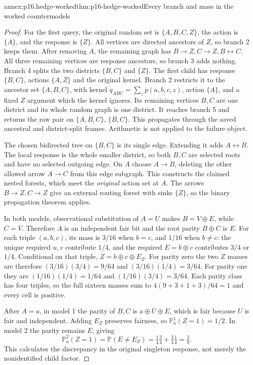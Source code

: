\begin{annexitem}{annex:p16.hedge-worked}{thm:p16-hedge-worked}{Every branch and mass in the worked countermodels}
\begin{proof}
For the first query, the original random set is \(\{A,B,C,Z\}\),
the action is \(\{A\}\), and the response is \(\{Z\}\).
All vertices are directed ancestors of \(Z\), so branch 2
keeps them. After removing \(A\), the remaining graph has
\(B\to Z,C\to Z,B\leftrightarrow C\). All three remaining
vertices are response ancestors, so branch 3 adds nothing.
Branch 4 splits the two districts \(\{B,C\}\) and \(\{Z\}\).
The first child has response \(\{B,C\}\), actions \(\{A,Z\}\)
and the original kernel. Branch 2 restricts it to the ancestor set
\(\{A,B,C\}\), with kernel \(q_{ABC}=\sum_z p(a,b,c,z)\),
action \(\{A\}\), and a fixed \(Z\) argument which the kernel
ignores. Its remaining vertices \(B,C\) are one district and
its whole random graph is one district. It reaches branch 5 and
returns the raw pair on \(\{A,B,C\}\), \(\{B,C\}\).
This propagates through the saved ancestral and district-split
frames. Arithmetic is not applied to the failure object.

The chosen bidirected tree on \(\{B,C\}\) is its single edge.
Extending it adds \(A\leftrightarrow B\). The local response
is the whole smaller district, so both \(B,C\) are selected
roots and have no selected outgoing edge. On \(A\) choose
\(A\to B\), deleting the other allowed arrow \(A\to C\)
from this edge subgraph. This constructs the claimed nested forests,
which meet the \emph{original} action set at \(A\). The arrows
\(B\to Z,C\to Z\) give an external routing forest with
sinks \(\{Z\}\), so the binary propagation theorem applies.

In both models, observational substitution of \(A=U\) makes
\(B=V\oplus E\), while \(C=V\). Therefore \(A\) is an
independent fair bit and the root parity \(B\oplus C\) is
\(E\). For each triple \((a,b,c)\), its mass is \(3/16\)
when \(b=c\), and \(1/16\) when \(b\ne c\): the unique
required \(u,v\) contribute \(1/4\), and the required
\(E=b\oplus c\) contributes \(3/4\) or \(1/4\).
Conditional on that triple, \(Z=b\oplus c\oplus E_Z\).
For parity zero the two \(Z\) masses are therefore
\((3/16)(3/4)=9/64\) and \((3/16)(1/4)=3/64\).
For parity one they are \((1/16)(1/4)=1/64\) and
\((1/16)(3/4)=3/64\). Each parity class has four triples,
so the full sixteen masses sum to
\(4(9+3+1+3)/64=1\) and every cell is positive.

After \(A=a\), in model 1 the parity of \(B,C\) is
\(a\oplus U\oplus E\), which is fair because \(U\) is
fair and independent. Adding \(E_Z\) preserves fairness, so
\(\mathbb P^1_a(Z=1)=1/2\). In model 2 the parity remains
\(E\), giving
\[
 \mathbb P^2_a(Z=1)
   =\mathbb P(E\ne E_Z)
   =\tfrac14\tfrac34+\tfrac34\tfrac14=\tfrac38.
\]
This calculates the discrepancy in the original singleton response,
not merely the nonidentified child factor.


\end{proof}
\end{annexitem}
